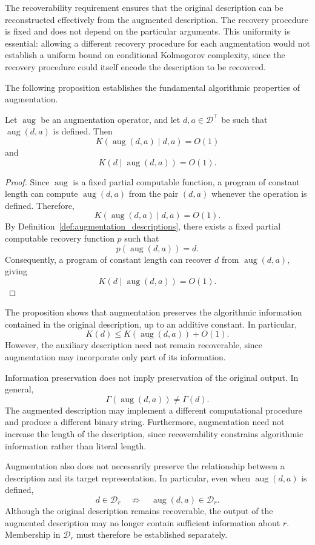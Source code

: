 The recoverability requirement ensures that the original description can be reconstructed effectively from the augmented description. The recovery procedure is fixed and does not depend on the particular arguments. This uniformity is essential: allowing a different recovery procedure for each augmentation would not establish a uniform bound on conditional Kolmogorov complexity, since the recovery procedure could itself encode the description to be recovered.

The following proposition establishes the fundamental algorithmic properties of augmentation.

\begin{proposition}
\label{prop:augmentation_information_preservation}
Let $\operatorname{aug}$ be an augmentation operator, and let $d,a\in\mathcal{D}^\top$ be such that
$\operatorname{aug}(d,a)$ is defined. Then
\[
K(\operatorname{aug}(d,a)\mid d,a)=O(1)
\]
and
\[
K(d\mid\operatorname{aug}(d,a))=O(1).
\]
\end{proposition}
\begin{proof}
Since $\operatorname{aug}$ is a fixed partial computable function, a program of constant length can compute $\operatorname{aug}(d,a)$ from the pair $(d,a)$ whenever the operation is defined. Therefore,
\[
K(\operatorname{aug}(d,a)\mid d,a)=O(1).
\]
By Definition~\ref{def:augmentation_descriptions}, there exists a fixed partial computable recovery function $p$
such that
\[
p(\operatorname{aug}(d,a))=d.
\]
Consequently, a program of constant length can recover $d$ from $\operatorname{aug}(d,a)$, giving
\[
K(d\mid\operatorname{aug}(d,a))=O(1).
\]
\end{proof}

The proposition shows that augmentation preserves the algorithmic information contained in the original description, up to an additive constant. In particular,
\[
K(d)\le K(\operatorname{aug}(d,a))+O(1).
\]
However, the auxiliary description need not remain recoverable, since augmentation may incorporate only part of its information.

Information preservation does not imply preservation of the original output. In general,
\[
\Gamma(\operatorname{aug}(d,a)) \neq \Gamma(d).
\]
The augmented description may implement a different computational procedure and produce a different binary string. Furthermore, augmentation need not increase the length of the description, since recoverability constrains algorithmic information rather than literal length.

Augmentation also does not necessarily preserve the relationship between a description and its target representation. In particular, even when $\operatorname{aug}(d,a)$ is defined,
\[
d\in\mathcal D_r \quad\not\Rightarrow\quad \operatorname{aug}(d,a)\in\mathcal D_r.
\]
Although the original description remains recoverable, the output of the augmented description may no longer contain sufficient information about $r$. Membership in $\mathcal D_r$ must therefore be established separately.

